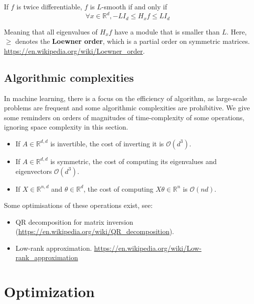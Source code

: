 \documentclass[
10pt, %
a4paper, %
oneside, %
headinclude,footinclude, %
BCOR5mm, %
]{scrartcl}
\begin{document}
\begin{lemma}
    
    If $f$ is twice differentiable, $f$ is $L$-smooth if and only if
    \begin{equation*}
        \forall x\in \mathbb{R}^d, -LI_d\leq H_xf\leq LI_d
    \end{equation*}

	 Meaning that all eigenvalues of $H_xf$ have a module that is smaller than $L$. Here, $\geq$ denotes the \textbf{{Loewner order}}, which is a partial order on symmetric matrices. \url{https://en.wikipedia.org/wiki/Loewner_order}.
\end{lemma}

\subsection{\large\color{MidnightBlue}Algorithmic complexities}

In machine learning, there is a focus on the efficiency of algorithm, as large-scale problems are frequent and some algorithmic complexities are prohibitive. We give some reminders on orders of magnitudes of time-complexity of some operations, ignoring space complexity in this section.

\begin{itemize}
    \item If $A\in \mathbb{R}^{d, d}$ is invertible, the cost of inverting it is $ \mathcal{O} (d^3)$.
    \item If $A\in \mathbb{R}^{d, d}$ is symmetric, the cost of computing its eigenvalues and eigenvectors $ \mathcal{O} (d^3)$.
    \item If $X\in \mathbb{R}^{n,d}$ and $\theta\in \mathbb{R}^d$, the cost of computing $ X\theta\in \mathbb{R}^n$ is $ \mathcal{O} (nd)$.
\end{itemize}

Some optimisations of these operations exist, see:
\begin{itemize}
    \item QR decomposition for matrix inversion (\url{https://en.wikipedia.org/wiki/QR_decomposition}).
    \item Low-rank approximation. \url{https://en.wikipedia.org/wiki/Low-rank_approximation} 
\end{itemize}

\section{\large\color{Blue}Optimization}
\end{document}
